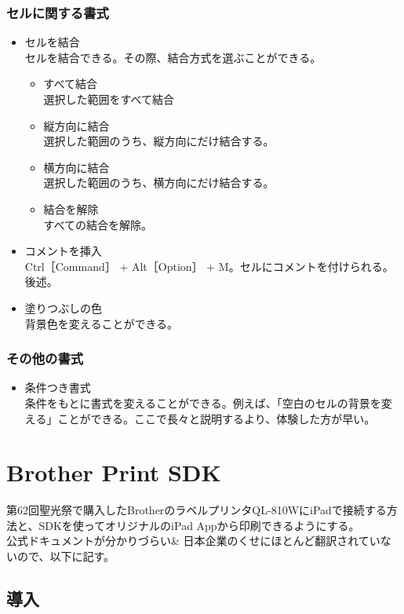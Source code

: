 \documentclass[a4paper]{ltjsreport}
\begin{document}
\subsubsection{セルに関する書式}
\begin{itemize}
  \item セルを結合\\
        セルを結合できる。その際、結合方式を選ぶことができる。
        \begin{itemize}
          \item すべて結合\\
                選択した範囲をすべて結合
          \item 縦方向に結合\\
                選択した範囲のうち、縦方向にだけ結合する。
          \item 横方向に結合\\
                選択した範囲のうち、横方向にだけ結合する。
          \item 結合を解除\\
                すべての結合を解除。
        \end{itemize}
  \item コメントを挿入\\
        Ctrl［Command］ + Alt［Option］ + M。セルにコメントを付けられる。後述。
  \item 塗りつぶしの色\\
        背景色を変えることができる。
\end{itemize}
\subsubsection{その他の書式}
\begin{itemize}
  \item 条件つき書式\\
        条件をもとに書式を変えることができる。例えば、「空白のセルの背景を変える」ことができる。ここで長々と説明するより、体験した方が早い。
\end{itemize}
\newpage
\section{Brother Print SDK}\label{sec:Brother Print SDK}
第62回聖光祭で購入したBrotherのラベルプリンタQL-810WにiPadで接続する方法と、SDKを使ってオリジナルのiPad Appから印刷できるようにする。\\
公式ドキュメントが分かりづらい\& 日本企業のくせにほとんど翻訳されていないので、以下に記す。
\subsection{導入}
\end{document}
